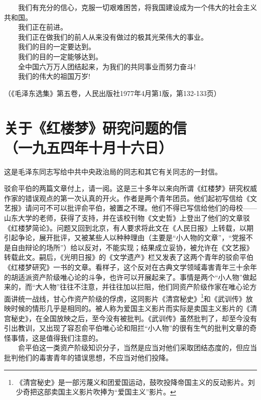 \documentclass[cn,11pt,chinese]{elegantbook}
\def\myformat#1{\hfil\hfil #1}
\begin{document}
　　我们有充分的信心，克服一切艰难困苦，将我国建设成为一个伟大的社会主义共和国。\\
　　我们正在前进。\\
　　我们正在做我们的前人从来没有做过的极其光荣伟大的事业。\\
　　我们的目的一定要达到。\\
　　我们的目的一定能够达到。\\
　　全中国六万万人团结起来，为我们的共同事业而努力奋斗!\\
　　我们的伟大的祖国万岁!
\begin{flushright}（《毛泽东选集》第五卷，人民出版社1977年4月第1版，第132-133页）\end{flushright}
\newpage\section*{\myformat{关于《红楼梦》研究问题的信}\\\myformat{（一九五四年十月十六日）}}
\begin{introduction}\item  这是毛泽东同志写给中共中央政治局的同志和其它有关同志的一封信。\end{introduction}
驳俞平伯的两篇文章付上，请一阅。这是三十多年以来向所谓《红楼梦》研究权威作家的错误观点的第一次认真的开火。作者是两个青年团员。他们起初写信给《文艺报》请问可不可以批评俞平伯，被置之不理。他们不得已写信给他们的母校——山东大学的老师，获得了支持，并在该校刊物《文史哲》上登出了他们的文章驳《红楼梦简论》。问题又回到北京，有人要求将此文在《人民日报》上转载，以期引起争论，展开批评，又被某些人以种种理由（主要是“小人物的文章”，“党报不是自由辩论的场所”）给以反对，不能实现；结果成立妥协，被允许在《文艺报》转载此文。嗣后，《光明日报》的《文学遗产》栏又发表了这两个青年的驳俞平伯《红楼梦研究》一书的文章。看样子，这个反对在古典文学领域毒害青年三十余年的胡适派资产阶级唯心论的斗争，也许可以开展起来了。事情是两个“小人物”做起来的，而“大人物”往往不注意，并往往加以拦阻，他们同资产阶级作家在唯心论方面讲统一战线，甘心作资产阶级的俘虏，这同影片《清宫秘史》\footnote[1]{《清宫秘史》是一部污蔑义和团爱国运动，鼓吹投降帝国主义的反动影片。刘少奇把这部卖国主义影片吹捧为“爱国主义”影片。}和《武训传》放映时候的情形几乎是相同的。被人称为爱国主义影片而实际是卖国主义影片的《清宫秘史》，在全国放映之后，至今没有被批判。《武训传》虽然批判了，却至今没有引出教训，又出现了容忍俞平伯唯心论和阻拦“小人物”的很有生气的批判文章的奇怪事情，这是值得我们注意的。\\
　　俞平伯这一类资产阶级知识分子，当然是应当对他们采取团结态度的，但应当批判他们的毒害青年的错误思想，不应当对他们投降。\\
\end{document}
